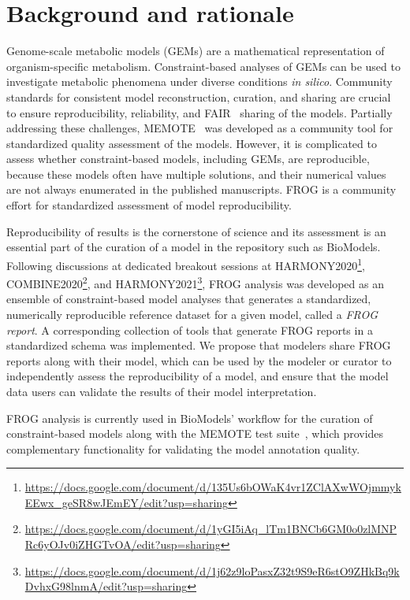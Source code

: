 \chapter{Background and rationale}

Genome-scale metabolic models (GEMs) are a mathematical representation of organism-specific metabolism. Constraint-based analyses of GEMs can be used to investigate metabolic phenomena under diverse conditions \textit{in silico}.  Community standards for consistent model reconstruction, curation, and sharing are crucial to ensure reproducibility, reliability, and FAIR~\cite{stall2019make} sharing of the models. Partially addressing these challenges, MEMOTE~\cite{lieven2020memote} was developed as a community tool for standardized quality assessment of the models. However, it is complicated to assess whether constraint-based models, including GEMs, are reproducible, because these models often have multiple solutions, and their numerical values are not always enumerated in the published manuscripts. FROG is a community effort for standardized assessment of model reproducibility.

Reproducibility of results is the cornerstone of science and its assessment is an essential part of the curation of a model in the repository such as BioModels. Following discussions at dedicated breakout sessions at HARMONY2020\footnote{\url{https://docs.google.com/document/d/135Us6bOWaK4vr1ZClAXwWOjmmykEEwx_geSR8wJEmEY/edit?usp=sharing}}, COMBINE2020\footnote{\url{https://docs.google.com/document/d/1yGI5iAq_lTm1BNCb6GM0o0zlMNPRc6yOJv0iZHGTvOA/edit?usp=sharing}}, and HARMONY2021\footnote{\url{https://docs.google.com/document/d/1j62z9loPasxZ32t9S9eR6stO9ZHkBq9kDvhxG98lnmA/edit?usp=sharing}}, FROG analysis was developed as an ensemble of constraint-based model analyses that generates a standardized, numerically reproducible reference dataset for a given model, called a \emph{FROG report}. A corresponding collection of tools that generate FROG reports in a standardized schema was implemented. We propose that modelers share FROG reports along with their model, which can be used by the modeler or curator to independently assess the reproducibility of a model, and ensure that the model data users can validate the results of their model interpretation.

FROG analysis is currently used in BioModels' workflow for the curation of constraint-based models along with the MEMOTE test suite~\cite{lieven2020memote}, which provides complementary functionality for validating the model annotation quality.

